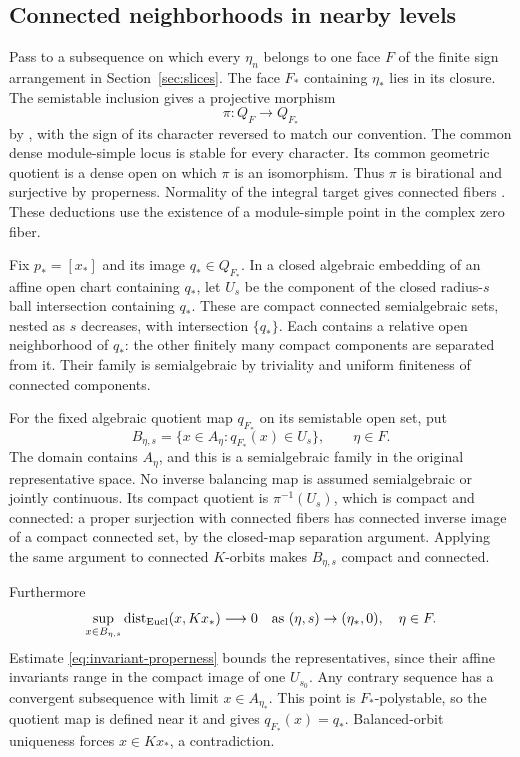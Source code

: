 \subsection{Connected neighborhoods in nearby levels}
Pass to a subsequence on which every $\eta_n$ belongs to one face
$F$ of the finite sign arrangement in Section~\ref{sec:slices}.
The face $F_*$ containing $\eta_*$ lies in its closure.
The semistable inclusion gives a projective morphism
\begin{equation}\label{eq:face-map}
 \pi:Q_F\longrightarrow Q_{F_*}
\end{equation}
by \cite[Lemma~2.4]{BeSc24}, with the sign of its character reversed
to match our convention.
The common dense module-simple locus is stable for every character.
Its common geometric quotient is a dense open on which $\pi$ is
an isomorphism. Thus $\pi$ is birational and surjective by properness.
Normality of the integral target gives connected fibers
\cite[Lemma~37.53.6, Tag 0AY8]{Stacks}.
These deductions use the existence of a module-simple point in the complex zero fiber.

Fix $p_*=[x_*]$ and its image $q_*\in Q_{F_*}$.
In a closed algebraic embedding of an affine open chart containing
$q_*$, let $U_s$ be the component of the closed radius-$s$ ball
intersection containing $q_*$. These are compact connected
semialgebraic sets, nested as $s$ decreases, with intersection
$\{q_*\}$. Each contains a relative open neighborhood of $q_*$:
the other finitely many compact components are separated from it.
Their family is semialgebraic by triviality and uniform finiteness
of connected components.

For the fixed algebraic quotient map $q_{F_*}$ on its semistable
open set, put
\begin{equation}\label{eq:balanced-neighborhood}
 B_{\eta,s}=\{x\in A_\eta:q_{F_*}(x)\in U_s\},\qquad\eta\in F.
\end{equation}
The domain contains $A_\eta$, and this is a semialgebraic family
in the original representative space. No inverse balancing map
is assumed semialgebraic or jointly continuous.
Its compact quotient is $\pi^{-1}(U_s)$, which is compact and
connected: a proper surjection with connected fibers has connected
inverse image of a compact connected set, by the closed-map
separation argument. Applying the same argument to connected
$K$-orbits makes $B_{\eta,s}$ compact and connected.

Furthermore
\begin{equation}\label{eq:orbit-collapse}
 \sup_{x\in B_{\eta,s}}\operatorname{dist}_{\rm Eucl}(x,Kx_*)
 \longrightarrow0\quad\text{as }(\eta,s)\to(\eta_*,0),\quad\eta\in F.
\end{equation}
Estimate \eqref{eq:invariant-properness} bounds the representatives,
since their affine invariants range in the compact image of one
$U_{s_0}$. Any contrary sequence has a convergent subsequence with
limit $x\in A_{\eta_*}$. This point is $F_*$-polystable, so the
quotient map is defined near it and gives $q_{F_*}(x)=q_*$.
Balanced-orbit uniqueness forces $x\in Kx_*$, a contradiction.

